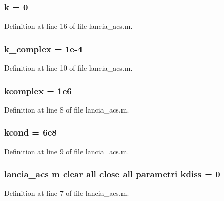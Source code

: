 \hypertarget{a00111_adc468c70fb574ebd07287b38d0d0676d}{
\subsubsection[{k}]{\setlength{\rightskip}{0pt plus 5cm}k = 0}}\label{a00111_adc468c70fb574ebd07287b38d0d0676d}


Definition at line 16 of file lancia\+\_\+acs.\+m.

\hypertarget{a00111_ad821064ff58d369f2a880dc5bf3db527}{
\subsubsection[{k\+\_\+complex}]{\setlength{\rightskip}{0pt plus 5cm}k\+\_\+complex = 1e-\/4}}\label{a00111_ad821064ff58d369f2a880dc5bf3db527}


Definition at line 10 of file lancia\+\_\+acs.\+m.

\hypertarget{a00111_a9cf172af920b969c5411ac19e5e13e22}{
\subsubsection[{kcomplex}]{\setlength{\rightskip}{0pt plus 5cm}kcomplex = 1e6}}\label{a00111_a9cf172af920b969c5411ac19e5e13e22}


Definition at line 8 of file lancia\+\_\+acs.\+m.

\hypertarget{a00111_af49f64b0687f4e269a7dc8e56ca82772}{
\subsubsection[{kcond}]{\setlength{\rightskip}{0pt plus 5cm}kcond = 6e8}}\label{a00111_af49f64b0687f4e269a7dc8e56ca82772}


Definition at line 9 of file lancia\+\_\+acs.\+m.

\hypertarget{a00111_aa3a014475bd24120996191acceaa4f3d}{
\subsubsection[{kdiss}]{\setlength{\rightskip}{0pt plus 5cm}lancia\+\_\+acs m clear all close all parametri kdiss = 0}}\label{a00111_aa3a014475bd24120996191acceaa4f3d}


Definition at line 7 of file lancia\+\_\+acs.\+m.

